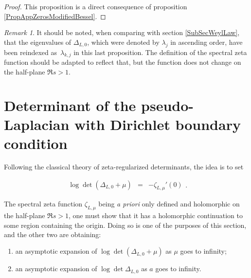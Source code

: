 \documentclass{jams-l}
\theoremstyle{definition}
\theoremstyle{remark}
\newtheorem{remark}[theorem]{Remark}
\numberwithin{equation}{section}
\begin{document}
        \begin{proof}
        
            This proposition is a direct consequence of proposition \ref{PropAppZerosModifiedBessel}.
        
        \end{proof}
        
        \begin{remark}
        
            It should be noted, when comparing with section \ref{SubSecWeylLaw}, that the eigenvalues of $\Delta_{L,0}$, which were denoted by $\lambda_j$ in ascending order, have been reindexed as~$\lambda_{k,j}$ in this last proposition. The definition of the spectral zeta function should be adapted to reflect that, but the function does not change on the half-plane $\Re s > 1$.
        
        \end{remark}





\section{Determinant of the pseudo-Laplacian with Dirichlet boundary condition}
\label{SecDetPseudoLaplacian}

    Following the classical theory of zeta-regularized determinants, the idea is to set
    
    \[ \begin{array}{lll}
            \log \det \left( \Delta_{L,0} + \mu \right) & = & - \zeta_{L, \mu} ' \left( 0 \right)
        \end{array} . \]
    
    \noindent The spectral zeta function $\zeta_{L,\mu}$ being \textit{a priori} only defined and holomorphic on the half-plane $\Re s > 1$, one must show that it has a holomorphic continuation to some region containing the origin. Doing so is one of the purposes of this section, and the other two are obtaining:
    
    \begin{enumerate}
        \item an asymptotic expansion of $\log \det \left( \Delta_{L,0} + \mu \right)$ as $\mu$ goes to infinity;
        
        \item an asymptotic expansion of $\log \det \Delta_{L,0}$ as $a$ goes to infinity.
    \end{enumerate}
    
\end{document}
